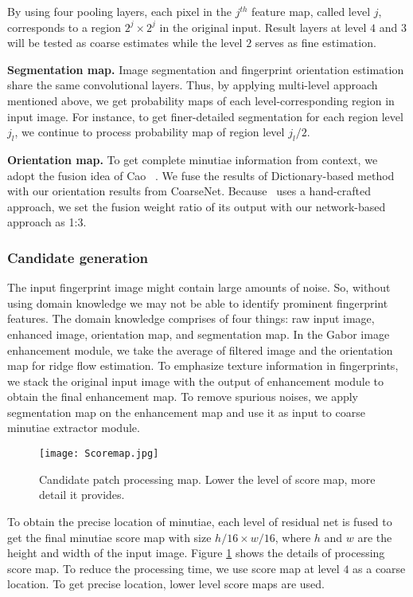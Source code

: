 \documentclass[10pt,twocolumn,letterpaper]{article}
\begin{document}
By using four pooling layers, each pixel in the $j^{th}$ feature map, called level $j$, corresponds to a region $2^j \times 2^j$ in the original input. Result layers at level $4$ and $3$ will be tested as coarse estimates while the level $2$ serves as fine estimation.

\textbf{Segmentation map.}
Image segmentation and fingerprint orientation estimation share the same convolutional layers. Thus, by applying multi-level approach mentioned above, we get probability maps of each level-corresponding region in input image. For instance, to get finer-detailed segmentation for each region level $j_l$, we continue to process probability map of region level $j_l/2$.

\textbf{Orientation map.}
To get complete minutiae information from context, we adopt the fusion idea of Cao \etal~\cite{cao2017automated}. We fuse the results of Dictionary-based method~\cite{yang2014localized} with our orientation results from CoarseNet. Because~\cite{yang2014localized} uses a hand-crafted approach, we set the fusion weight ratio of its output with our network-based approach as 1:3.
\vspace{-2mm}
\subsubsection{Candidate generation}
The input fingerprint image might contain large amounts of noise. So, without using domain knowledge we may not be able to identify prominent fingerprint features. The domain knowledge comprises of four things: raw input image, enhanced image, orientation map, and segmentation map. In the Gabor image enhancement module, we take the average of filtered image and the orientation map for ridge flow estimation. To emphasize texture information in fingerprints, we stack the original input image with the output of enhancement module to obtain the final enhancement map. To remove spurious noises, we apply segmentation map on the enhancement map and use it as input to coarse minutiae extractor module.

\begin{figure}[!bp]
\centering
\texttt{[image: Scoremap.jpg]}
\caption{Candidate patch processing map. Lower the level of score map, more detail it provides.}
\label{fig:candidate_process_map}
\end{figure}

To obtain the precise location of minutiae, each level of residual net is fused to get the final minutiae score map with size $h/16 \times w/16$, where $h$ and $w$ are the height and width of the input image. Figure \ref{fig:candidate_process_map} shows the details of processing score map. To reduce the processing time, we use score map at level $4$ as a coarse location. To get precise location, lower level score maps are used.
\vspace{-2mm}
\end{document}
